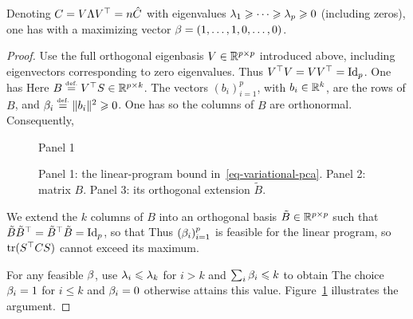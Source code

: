 \begin{lem}\label{lem-upper-bound-pca}
	Denoting $C=V\Lambda V^\top=n\hat C$ with eigenvalues $\lambda_1\geqslant\cdots\geqslant\lambda_p\geqslant0$ (including zeros), one has
	with a maximizing vector $\beta=(1,\ldots,1,0,\ldots,0)$.
\end{lem}
\begin{proof}
	Use the full orthogonal eigenbasis $V\in\mathbb{R}^{p\times p}$ introduced above, including eigenvectors corresponding to zero eigenvalues. Thus $V^\top V=VV^\top=\mathrm{Id}_p$. One has
	Here $B\stackrel{\mbox{\upshape\tiny def.}}{=} V^\top S \in \mathbb{R}^{p \times k}$. The vectors $(b_i)_{i=1}^p$, with $b_i \in \mathbb{R}^k$, are the rows of $B$, and $\beta_i \stackrel{\mbox{\upshape\tiny def.}}{=} \lVert b_i\rVert^2 \geqslant 0$.
	One has
	so the columns of $B$ are orthonormal. Consequently,
	
	\begin{figure}[tbp]
\centering
{\small\sffamily\color{BookMuted}Panel 1\par}\smallskip
{}\par\medskip
{}\hfill
{}
\caption{Panel 1: the linear-program bound in~\eqref{eq-variational-pca}. Panel 2: matrix $B$. Panel 3: its orthogonal extension $\tilde B$.}
\label{fig-pca-var-proof}
\end{figure}


	We extend the $k$ columns of $B$ into an orthogonal basis $\tilde B \in \mathbb{R}^{p \times p}$ such that $\tilde B \tilde B^\top = \tilde B^\top\tilde B=\mathrm{Id}_p$, so that
	Thus $(\beta_i)_{i=1}^p$ is feasible for the linear program, so $\operatorname{tr}(S^\top C S)$
	cannot exceed its maximum.
	
	For any feasible $\beta$, use $\lambda_i\leqslant\lambda_k$ for $i>k$ and $\sum_i\beta_i\leqslant k$ to obtain
The choice $\beta_i=1$ for $i\leq k$ and $\beta_i=0$ otherwise attains this value. Figure~\ref{fig-pca-var-proof} illustrates the argument.
\end{proof}

